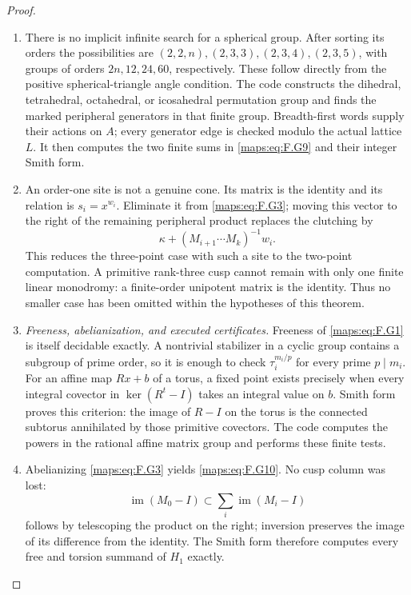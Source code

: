 \begin{proof}
\begin{enumerate}[label=\arabic*.]
\item There is no implicit infinite search for a spherical group.
After sorting its orders the possibilities are
$(2,2,n),(2,3,3),(2,3,4),(2,3,5)$, with groups of orders
$2n,12,24,60$, respectively.  These follow directly from
the positive spherical-triangle angle condition.
The code constructs the dihedral, tetrahedral, octahedral,
or icosahedral permutation group and finds the marked
peripheral generators in that finite group.  Breadth-first
words supply their actions on $A$; every generator edge is
checked modulo the actual lattice $L$.  It then computes
the two finite sums in \eqref{maps:eq:F.G9} and their integer Smith form.

\item An order-one site is not a genuine cone.  Its matrix is the
identity and its relation is $s_i=x^{w_i}$.  Eliminate it
from \eqref{maps:eq:F.G3}; moving this vector to the right of the remaining
peripheral product replaces the clutching by
\[
       \kappa+(M_{i+1}\cdots M_k)^{-1}w_i.                 \tag{F.G11}\label{maps:eq:F.G11}
\]
This reduces the three-point case with such a site to the
two-point computation.  A primitive rank-three cusp cannot
remain with only one finite linear monodromy: a finite-order
unipotent matrix is the identity.  Thus no smaller case has
been omitted within the hypotheses of this theorem.

\item \emph{Freeness, abelianization, and executed certificates.}
Freeness of \eqref{maps:eq:F.G1} is itself decidable exactly.  A nontrivial
stabilizer in a cyclic group contains a subgroup of prime
order, so it is enough to check $\tau_i^{m_i/p}$ for every
prime $p\mid m_i$.  For an affine map $Rx+b$ of a torus,
a fixed point exists precisely when every integral covector
in $\ker(R^t-I)$ takes an integral value on $b$.
Smith form proves this criterion: the image of $R-I$ on
the torus is the connected subtorus annihilated by those
primitive covectors.  The code computes the powers in the
rational affine matrix group and performs these finite tests.

\item Abelianizing \eqref{maps:eq:F.G3} yields \eqref{maps:eq:F.G10}.  No cusp column was lost:
\[
 \operatorname{im}(M_0-I)
       \subset\sum_i\operatorname{im}(M_i-I)
\]
follows by telescoping the product on the right; inversion
preserves the image of its difference from the identity.
The Smith form therefore computes every free and torsion
summand of $H_1$ exactly.


\end{enumerate}
\end{proof}
